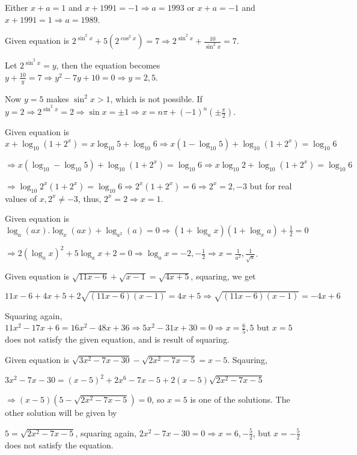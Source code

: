   Either $x + a = 1$ and $x + 1991 = -1\Rightarrow a = 1993$ or $x + a = -1$ and $x + 1991 = 1\Rightarrow a
  = 1989$.
\item Given equation is $2^{\sin^2x} + 5(2^{\cos^2x}) = 7 \Rightarrow 2^{\sin^2x} + \frac{10}{\sin^2x} = 7$.

  Let $2^{\sin^2x} = y$, then the equation becomes $y + \frac{10}{y} = 7 \Rightarrow y^2 - 7y + 10 = 0
  \Rightarrow y = 2, 5$.

  Now $y = 5$ makes $\sin^2x > 1$, which is not possible. If $y = 2\Rightarrow 2^{\sin^2x} = 2\Rightarrow
  \sin x = \pm1 \Rightarrow x = n\pi + (-1)^n\left(\pm\frac{\pi}{2}\right)$.
\item Given equation is $x + \log_{10}(1 + 2^x) = x\log_{10}5 + \log_{10}6 \Rightarrow x(1 - \log_{10}5) +
  \log_{10}(1 + 2^x) = \log_{10}6$

  $\Rightarrow x(\log_{10} - \log_{10}5) + \log_{10}(1 + 2^x) = \log_{10}6 \Rightarrow x\log_{10}2 +
  \log_{10}(1 + 2^x) = \log_{10}6$

  $\Rightarrow \log_{10}2^x(1 + 2^x) = \log_{10}6\Rightarrow 2^x(1 + 2^x) = 6\Rightarrow 2^x = 2, -3$ but
  for real values of $x, 2^x\neq -3$, thus, $2^x = 2 \Rightarrow x = 1$.
\item Given equation is $\log_a(ax).\log_x(ax) + \log_{a^2}(a) = 0\Rightarrow (1 + \log_ax)(1 + \log_xa) +
  \frac{1}{2} = 0$

  $\Rightarrow 2(\log_ax)^2 + 5\log_ax + 2 = 0 \Rightarrow \log_ax = -2, -\frac{1}{2}\Rightarrow x =
  \frac{1}{a^2}, \frac{1}{\sqrt{a}}$.
\item Given equation is $\sqrt{11x - 6} + \sqrt{x - 1} = \sqrt{4x + 5}$, squaring, we get

  $11x - 6 + 4x + 5 + 2\sqrt{(11x - 6)(x - 1)} = 4x + 5 \Rightarrow \sqrt{(11x - 6)(x - 1)} = -4x + 6$

  Squaring again, $11x^2 - 17x + 6 = 16x^2 - 48x + 36 \Rightarrow 5x^2 - 31x + 30 = 0\Rightarrow x =
  \frac{6}{5}, 5$ but $x = 5$ does not satisfy the given equation, and is result of squaring.
\item Given equation is $\sqrt{3x^2 - 7x - 30} - \sqrt{2x^2 - 7x - 5} = x - 5$. Sqauring,

  $3x^2 - 7x - 30 = (x - 5)^2 + 2x^6 - 7x - 5 + 2(x - 5)\sqrt{2x^2 - 7x - 5}$

  $\Rightarrow (x - 5)(5 - \sqrt{2x^2 - 7x - 5}) = 0$, so $x = 5$ is one of the solutions. The other
  solution will be given by

  $5 = \sqrt{2x^2 - 7x - 5}$, squaring again, $2x^2 - 7x - 30 = 0\Rightarrow x = 6, -\frac{5}{2}$, but $x =
  -\frac{5}{2}$ does not satisfy the equation.

